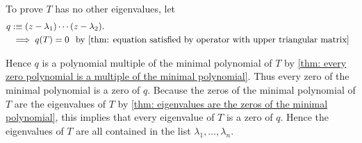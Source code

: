 \begin{prf}
  To prove $T$ has no other eigenvalues, let
  \begin{equation}
    \begin{aligned}
      q &:\equiv (z-\lambda_1) \cdots (z-\lambda_2). \\
      &\implies q(T) = 0 \;\;\, \text{by \ref{thm: equation satisfied by operator with upper triangular matrix}}\;\;
    \end{aligned}
  \end{equation}

  Hence $q$ is a polynomial multiple of the minimal polynomial of $T$ by \ref{thm: every zero polynomial is a multiple of the minimal polynomial}. Thus every zero of the minimal polynomial is a zero of $q$.
  Because the zeros of the minimal polynomial of $T$ are the eigenvalues of $T$ by \ref{thm: eigenvalues are the zeros of the minimal polynomial}, this implies that every eigenvalue of $T$ is a zero of $q$. Hence the eigenvalues of $T$ are all contained in the list $\lambda_1, \ldots, \lambda_n$.
\end{prf}


